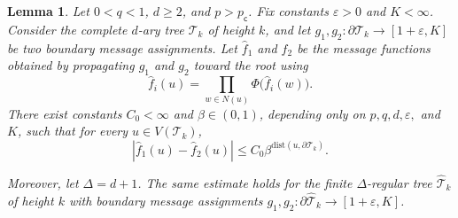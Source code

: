 \documentclass[11pt]{amsart}
\theoremstyle{plain}
\newtheorem{lemma}[theorem]{Lemma}
\theoremstyle{definition}
\theoremstyle{remark}
\newcommand{\pc}{p_{\mathsf{c}}}
\newcommand{\dist}{\mathrm{dist}}
\begin{document}
\begin{lemma}
\label{lem:uniform-contraction}
Let $0<q<1$, $d\ge2$, and $p>\pc$. Fix constants $\varepsilon>0$ and $K<\infty$. Consider the complete $d$-ary tree $\mathcal T_k$ of height $k$, and let $g_1,g_2:\partial\mathcal T_k\to[1+\varepsilon,K]$ be two boundary message assignments. Let $\widehat f_1$ and $\widehat f_2$ be the message functions obtained by propagating $g_1$ and $g_2$ toward the root using
\[
    \widehat f_i(u)
    =
    \prod_{w\in N(u)}
    \Phi\bigl(\widehat f_i(w)\bigr).
\]
There exist constants $C_0<\infty$ and $\beta\in(0,1)$, depending only on $p,q,d,\varepsilon,$ and $K$, such that for every $u\in V(\mathcal T_k)$,
\[
    \left|
        \widehat f_1(u)-\widehat f_2(u)
    \right|
    \le
    C_0
        \beta^{\dist(u,\partial\mathcal T_k)}.
\]

Moreover, let $\Delta=d+1$. The same estimate holds for the finite $\Delta$-regular tree $\widehat{\mathcal T}_k$ of height $k$ with boundary message assignments $g_1,g_2:\partial\widehat{\mathcal T}_k\to[1+\varepsilon,K]$.
\end{lemma}
\end{document}
